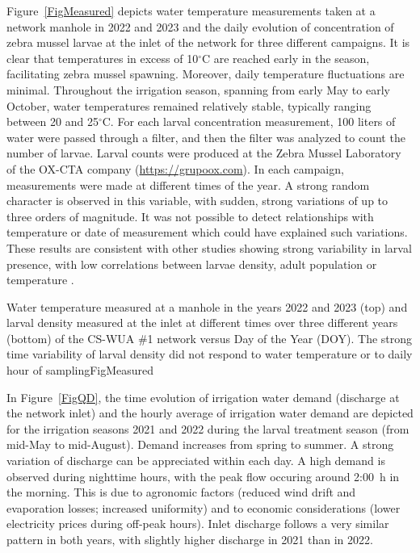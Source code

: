 \documentclass[review,authoryear]{elsarticle}
\begin{document}
Figure~\ref{FigMeasured} depicts water temperature measurements taken at a
network manhole in 2022 and 2023 and the daily evolution of concentration of
zebra mussel larvae at the inlet of the network for three different campaigns.
It is clear that temperatures in excess of 10$^\circ$C are reached early in the
season, facilitating zebra mussel spawning. Moreover, daily temperature
fluctuations are minimal. Throughout the irrigation season, spanning from early
May to early October, water temperatures remained relatively stable, typically
ranging between 20 and 25$^\circ$C. For each larval concentration measurement,
100 liters of water were passed through a filter, and then the filter was
analyzed to count the number of larvae. Larval counts were produced at the Zebra
Mussel Laboratory of the OX-CTA company (\url{https://grupoox.com}). In each
campaign, measurements were made at different times of the year. A strong random
character is observed in this variable, with sudden, strong variations of up to
three orders of magnitude. It was not possible to detect relationships with
temperature or date of measurement which could have explained such variations.
These results are consistent with other studies showing strong variability in
larval presence, with low correlations between larvae density, adult population
or temperature \citep{AlonzoMoya21}.

{Water temperature measured at a manhole in the years 2022 and 2023 (top) and
larval density measured at the inlet at different times over three different
years (bottom) of the CS-WUA \#1 network versus Day of the Year (DOY). The
strong time variability of larval density did not respond to water temperature
or to daily hour of sampling}{FigMeasured}

In Figure~\ref{FigQD}, the time evolution of irrigation water demand (discharge
at the network inlet) and the hourly average of irrigation water demand are
depicted for the irrigation seasons 2021 and 2022 during the larval
treatment season (from mid-May to mid-August). Demand increases from spring to
summer. A strong variation of discharge can be appreciated within each day. A
high demand is observed during nighttime hours, with the peak flow occuring
around 2:00~h in the morning. This is due to agronomic factors (reduced wind
drift and evaporation losses; increased uniformity) and to economic
considerations (lower electricity prices during off-peak hours). Inlet discharge
follows a very similar pattern in both years, with slightly higher discharge in
2021 than in 2022.
\end{document}
